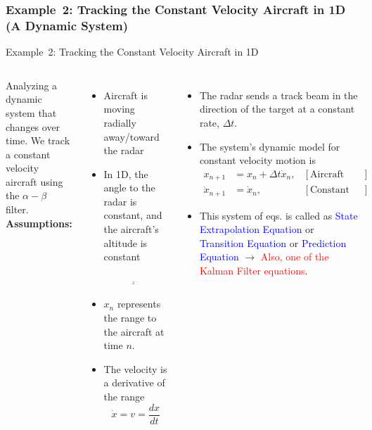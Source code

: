 \subsubsection{Example~2: Tracking the Constant Velocity Aircraft in 1D (A Dynamic System)}
\begin{frame}{Example~2: Tracking the Constant Velocity Aircraft in 1D}
\begin{columns}
    Analyzing a dynamic system that changes over time. We track a constant velocity aircraft using the $\alpha-\beta$ filter.\\
    
    \textbf{Assumptions:}
    \begin{itemize}
        \item Aircraft is moving radially away/toward the radar
        \item In 1D, the angle to the radar is constant, and the aircraft's altitude is constant
    \begin{figure}
	    \centering
	    \includegraphics[width=0.9\textwidth]{Figures/Chapter1/ex2_oneD_radar.png}
	    \label{fig:ex2_oneD_radar}
	 \vspace{-10pt}   
	\end{figure}
	\item $x_n$ represents the range to the aircraft at time $n$.
	\item The velocity is a derivative of the range
	$$\dot{x} = v = \frac{dx}{dt}$$
	\end{itemize}
	\begin{itemize}
	    \item The radar sends a track beam in the direction of the target at a constant rate, $\Delta t$.
	    \item The system's dynamic model for constant velocity motion is
	    \begin{align*}
	        x_{n+1} & = x_n + \Delta t \dot{x}_n, & [\text{Aircraft range}]\\
	        \dot{x}_{n+1} & = \dot{x}_{n}, & [\text{Constant velocity}]
	    \end{align*}
	    \item This system of eqs. is called as \textcolor{blue}{State Extrapolation Equation} or \textcolor{blue}{Transition Equation} or \textcolor{blue}{Prediction Equation} $\rightarrow$ \textcolor{red}{Also, one of the Kalman Filter equations}.
	\end{itemize}
\end{columns}    
\end{frame}

